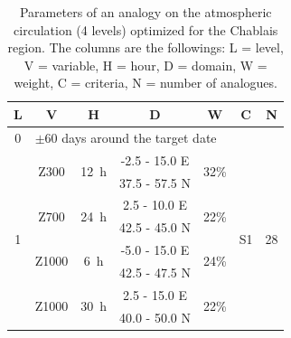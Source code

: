 \documentclass[twocol]{ametsoc}
\begin{document}
\begin{table}[htbp]
	\footnotesize
	\caption{Parameters of an analogy on the atmospheric circulation (4 levels) optimized for the Chablais region. The columns are the followings: L = level, V = variable, H = hour, D = domain, W = weight, C = criteria, N = number of analogues.}
	\begin{center}
		\begin{tabular}{ccccccc}
			\hline \textbf{L} & \textbf{V} & \textbf{H} & \textbf{D} & \textbf{W} & \textbf{C} & \textbf{N} \\ 
			\hline 
			0 & \multicolumn{6}{l}{$\pm 60$ days around the target date} \\
			\hline 
			\multirow{8}{*}{1} &  \multirow{2}{*}{Z300} & \multirow{2}{*}{12~h} & -2.5 - 15.0 \degree E & \multirow{2}{*}{32\%} & \multirow{8}{*}{S1} & \multirow{8}{*}{28} \\
			& & & 37.5 - 57.5 \degree N & & & \\ 
			& \multirow{2}{*}{Z700} & \multirow{2}{*}{24~h} & 2.5 - 10.0 \degree E & \multirow{2}{*}{22\%} & & \\ 
			& & & 42.5 - 45.0 \degree N & & & \\ 
			& \multirow{2}{*}{Z1000} & \multirow{2}{*}{6~h} & -5.0 - 15.0 \degree E & \multirow{2}{*}{24\%} & & \\ 
			& & & 42.5 - 47.5 \degree N & & & \\ 
			& \multirow{2}{*}{Z1000} & \multirow{2}{*}{30~h} & 2.5 - 15.0 \degree E & \multirow{2}{*}{22\%} & & \\ 
			& & & 40.0 - 50.0 \degree N & & & \\ 
			\hline 
		\end{tabular} 
	\end{center}
	\label{table:params_GA_z4}
\end{table}
\end{document}
